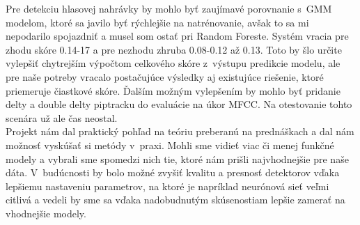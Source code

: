 \documentclass[11pt, a4paper]{article}
\begin{document}
	Pre detekciu hlasovej nahrávky by mohlo byť zaujímavé porovnanie s~GMM modelom, ktoré sa javilo byť rýchlejšie na natrénovanie, avšak to sa mi nepodarilo spojazdniť a musel som ostať pri Random Foreste. Systém vracia pre zhodu skóre 0.14-17 a pre nezhodu zhruba 0.08-0.12 až 0.13. Toto by šlo určite vylepšiť chytrejším výpočtom celkového skóre z~výstupu predikcie modelu, ale pre naše potreby vracalo postačujúce výsledky aj existujúce riešenie, ktoré priemeruje čiastkové skóre.
	Ďalším možným vylepšením by mohlo byť pridanie delty a double delty piptracku do evaluácie na úkor MFCC. Na otestovanie tohto scenára už ale čas neostal.
\\
	
	Projekt nám dal praktický pohľad na teóriu preberanú na prednáškach a dal nám možnosť vyskúšať si metódy v~praxi. Mohli sme vidieť viac či menej funkčné modely a vybrali sme spomedzi nich tie, ktoré nám prišli najvhodnejšie pre naše dáta. V~budúcnosti by bolo možné zvyšiť kvalitu a presnosť detektorov vďaka lepšiemu nastaveniu parametrov, na ktoré je napríklad neurónová sieť veľmi citlivá a vedeli by sme sa vďaka nadobudnutým skúsenostiam lepšie zamerať na vhodnejšie modely.
\end{document}
